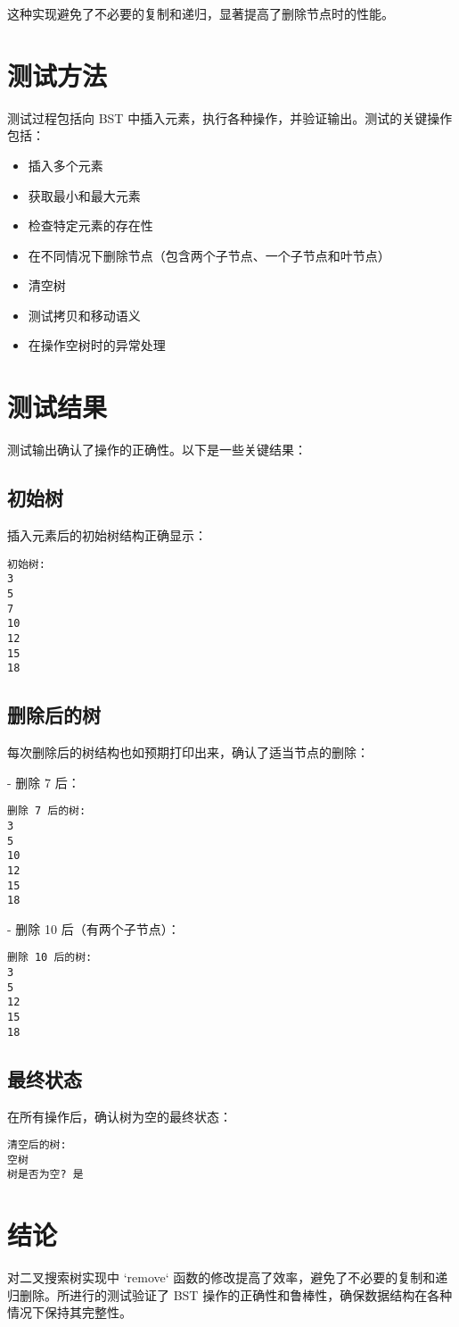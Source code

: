 \documentclass{article}
\begin{document}
这种实现避免了不必要的复制和递归，显著提高了删除节点时的性能。

\section{测试方法}
测试过程包括向 BST 中插入元素，执行各种操作，并验证输出。测试的关键操作包括：

\begin{itemize}
    \item 插入多个元素
    \item 获取最小和最大元素
    \item 检查特定元素的存在性
    \item 在不同情况下删除节点（包含两个子节点、一个子节点和叶节点）
    \item 清空树
    \item 测试拷贝和移动语义
    \item 在操作空树时的异常处理
\end{itemize}

\section{测试结果}
测试输出确认了操作的正确性。以下是一些关键结果：

\subsection{初始树}
插入元素后的初始树结构正确显示：

\begin{verbatim}
初始树:
3
5
7
10
12
15
18
\end{verbatim}

\subsection{删除后的树}
每次删除后的树结构也如预期打印出来，确认了适当节点的删除：

- 删除 7 后：
\begin{verbatim}
删除 7 后的树:
3
5
10
12
15
18
\end{verbatim}

- 删除 10 后（有两个子节点）：
\begin{verbatim}
删除 10 后的树:
3
5
12
15
18
\end{verbatim}

\subsection{最终状态}
在所有操作后，确认树为空的最终状态：

\begin{verbatim}
清空后的树:
空树
树是否为空? 是
\end{verbatim}

\section{结论}
对二叉搜索树实现中 `remove` 函数的修改提高了效率，避免了不必要的复制和递归删除。所进行的测试验证了 BST 操作的正确性和鲁棒性，确保数据结构在各种情况下保持其完整性。
\end{document}
